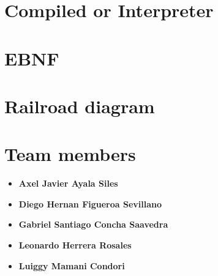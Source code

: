 \documentclass{article}
\begin{document}
\section{Compiled or Interpreter}
\label{sec:compiled-or-interpreter}

\section{EBNF}
\label{sec:bnf}

\section{Railroad diagram}
\label{sec:grail-road}

\section{Team members}
\label{sec:members}
\begin{itemize}
    \item \textbf{Axel Javier Ayala Siles}
    \item \textbf{Diego Hernan Figueroa Sevillano}
    \item \textbf{Gabriel Santiago Concha Saavedra}
    \item \textbf{Leonardo Herrera Rosales}
    \item \textbf{Luiggy Mamani Condori}
\end{itemize}
\end{document}
